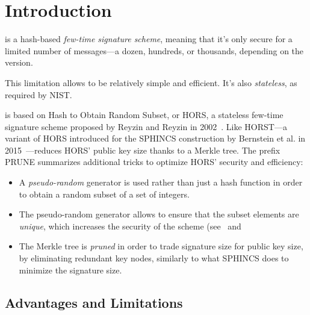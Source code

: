 \chapter{Introduction}\label{chap:introduction}

\gravity is a hash-based \emph{few-time signature scheme}, meaning that it's only secure for a limited number of messages---a dozen, hundreds, or thousands, depending on the version.

This limitation allows \gravity to be relatively simple and efficient. It's also \emph{stateless}, as required by NIST.

\gravity is based on Hash to Obtain Random Subset, or HORS, a stateless few-time signature scheme proposed by Reyzin and Reyzin in 2002~\cite{hors}. Like HORST---a variant of HORS introduced for the SPHINCS construction by Bernstein et al. in 2015~\cite{sphincs}---\gravity reduces HORS' public key size thanks to a Merkle tree. The prefix \textsf{PRUNE} summarizes additional tricks to optimize HORS' security and efficiency:
\begin{itemize}
\item A \emph{pseudo-random} generator is used rather than just a hash function in order to obtain a random subset of a set of integers.
\item The pseudo-random generator allows to ensure that the subset elements are \emph{unique}, which increases the security of the scheme (see~\cite[\S4]{masters} and~\cite{subsetres}
\item The Merkle tree is \emph{pruned} in order to trade signature size for public key size, by eliminating redundant key nodes, similarly to what SPHINCS does to minimize the signature size.
\end{itemize}

\section{Advantages and Limitations}

